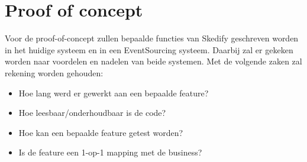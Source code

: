 \section{Proof of concept}
\label{sec:proof-of-concept}

Voor de proof-of-concept zullen bepaalde functies van Skedify geschreven worden in het huidige systeem en in een EventSourcing systeem. Daarbij zal er gekeken worden naar voordelen en nadelen van beide systemen. Met de volgende zaken zal rekening worden gehouden:

\begin{itemize}
  \item{Hoe lang werd er gewerkt aan een bepaalde feature?}
  \item{Hoe leesbaar/onderhoudbaar is de code?}
  \item{Hoe kan een bepaalde feature getest worden?}
  \item{Is de feature een 1-op-1 mapping met de business?}
\end{itemize}
